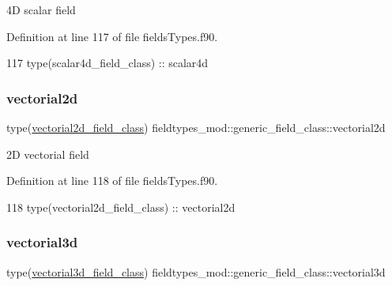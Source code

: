 4D scalar field 



Definition at line 117 of file fields\+Types.\+f90.


\begin{DoxyCode}
117         \textcolor{keywordtype}{type}(scalar4d\_field\_class) :: scalar4d
\end{DoxyCode}
\mbox{\label{structfieldtypes__mod_1_1generic__field__class_a8c04c463fb823576ae29de240eb209f5}} 
\subsubsection{\texorpdfstring{vectorial2d}{vectorial2d}}
{\footnotesize\ttfamily type(\mbox{\hyperlink{structfieldtypes__mod_1_1vectorial2d__field__class}{vectorial2d\+\_\+field\+\_\+class}}) fieldtypes\+\_\+mod\+::generic\+\_\+field\+\_\+class\+::vectorial2d\hspace{0.3cm}{\ttfamily [private]}}



2D vectorial field 



Definition at line 118 of file fields\+Types.\+f90.


\begin{DoxyCode}
118         \textcolor{keywordtype}{type}(vectorial2d\_field\_class) :: vectorial2d
\end{DoxyCode}
\mbox{\label{structfieldtypes__mod_1_1generic__field__class_aff0ebfb0a2e374714172bd0e7202f036}} 
\subsubsection{\texorpdfstring{vectorial3d}{vectorial3d}}
{\footnotesize\ttfamily type(\mbox{\hyperlink{structfieldtypes__mod_1_1vectorial3d__field__class}{vectorial3d\+\_\+field\+\_\+class}}) fieldtypes\+\_\+mod\+::generic\+\_\+field\+\_\+class\+::vectorial3d\hspace{0.3cm}{\ttfamily [private]}}



